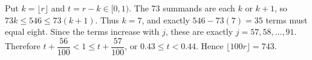 Put $ k=\lfloor r\rfloor $ and $ t=r-k\in[0,1)$. The 73 summands are each $ k $ or $ k+1 $, so $ 73k\le546\le73(k+1)$. Thus $ k=7 $, and exactly $ 546-73(7)=35 $ terms must equal eight. Since the terms increase with $ j $, these are exactly $ j=57,58,\ldots,91 $. Therefore $ t+\dfrac{56}{100}<1\le t+\dfrac{57}{100}$, or $ 0.43\le t<0.44 $. Hence $\boxed{\lfloor100r\rfloor=743}$.
